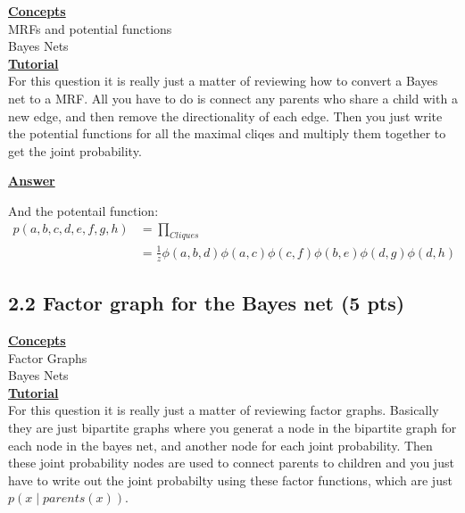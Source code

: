 \documentclass[11pt]{article}
\begin{document}
\noindent \textbf{\underline{Concepts}}\\
MRFs and potential functions\\
Bayes Nets\\
\noindent \textbf{\underline{Tutorial}}\\
For this question it is really just a matter of reviewing how to convert a Bayes net to a MRF.  All you have to do is connect any parents who share a child with a new edge,
 and then remove the directionality of each edge.  Then you just write the potential functions for all the maximal cliqes and multiply them together to get the joint
 probability.

\noindent \textbf{\underline{Answer}}\\
And the potentail function: \\
\begin{align*}
    p(a,b,c,d,e,f,g,h)  &= \prod_{Cliques}\\
                        &= \frac{1}{z}\phi(a,b,d)\phi(a,c)\phi(c,f)\phi(b,e)\phi(d,g)\phi(d,h)
\end{align*}
\subsection{2.2 Factor graph for the Bayes net (5 pts)}
\noindent \textbf{\underline{Concepts}}\\
Factor Graphs\\
Bayes Nets\\
\noindent \textbf{\underline{Tutorial}}\\
For this question it is really just a matter of reviewing factor graphs.  Basically they are just bipartite graphs where you generat a node in the bipartite graph for each
 node in the bayes net, and another node for each joint probability.  Then these joint probability nodes are used to connect parents to children and you just have to write
 out the joint probabilty using these factor functions, which are just $p(x \mid parents(x))$.\\
\end{document}
